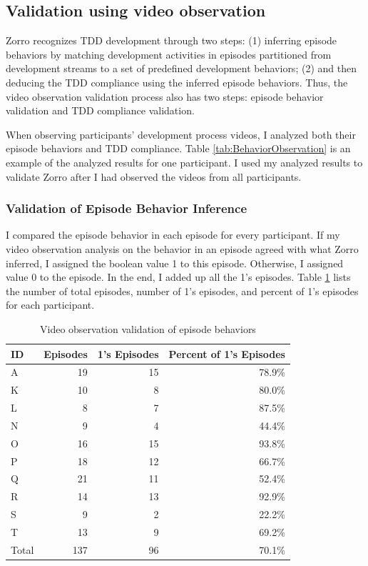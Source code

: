 \subsection{Validation using video observation}
\label{subsec:VideoObservationValidation}
Zorro recognizes TDD development through two steps: (1) inferring 
episode behaviors by matching development activities in episodes 
partitioned from development streams to a set of predefined 
development behaviors; (2) and then deducing the TDD compliance 
using the inferred episode behaviors. Thus, the video observation
validation process also has two steps: episode behavior validation
and TDD compliance validation.

When observing participants' development process videos, I analyzed
both their episode behaviors and TDD compliance. 
Table \ref{tab:BehaviorObservation} is an example of the analyzed 
results for one participant. I used my analyzed results to 
validate Zorro after I had observed the videos from all participants.

\subsubsection{Validation of Episode Behavior Inference}
\label{subsubsec:EpisodeBehavior}
I compared the episode behavior in each episode for every participant.
If my video observation analysis on the behavior in an episode agreed with 
what Zorro inferred, I assigned the boolean value 1 to this 
episode. Otherwise, I assigned value 0 to the episode. In the end, I 
added up all the 1's episodes. Table \ref{tab:EpisodeBehaviorAgreed} 
lists the number of total episodes, number of 1's episodes, and percent 
of 1's episodes for each participant. 
\begin{table}[!ht]
\centering
  \begin{tabular}{|l|r|r|r|}
  \hline
    ID & Episodes  & 1's Episodes & Percent of 1's Episodes\\ \hline
    A       & 19   &  15   & 78.9\% \\ \hline  
    K       & 10   &   8   & 80.0\% \\ \hline
    L       &  8   &   7   & 87.5\% \\ \hline  
    N       &  9   &   4   & 44.4\% \\ \hline
    O       & 16   &  15   & 93.8\% \\ \hline
    P       & 18   &  12   & 66.7\% \\ \hline
    Q       & 21   &  11   & 52.4\% \\ \hline
    R       & 14   &  13   & 92.9\% \\ \hline
    S       &  9   &   2   & 22.2\% \\ \hline
    T       & 13   &   9   & 69.2\% \\ \hline
    Total   & 137  &  96   & 70.1\% \\ \hline
    \end{tabular}
  \caption{Video observation validation of episode behaviors}
  \label{tab:EpisodeBehaviorAgreed} 
\end{table}

